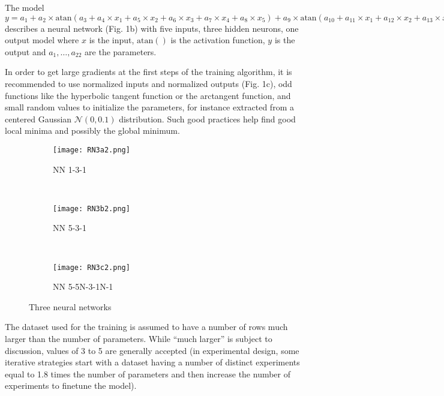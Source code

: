 The model
\(y = a_1 + a_2\times \text{atan}(a_3 + a_4\times x_1 + a_5\times x_2 + a_6\times x_3 + a_7\times x_4 + a_8\times x_5) + a_9\times \text{atan}(a_{10} + a_{11}\times x_1 + a_{12}\times x_2 + a_{13}\times x_3 + a_{14}\times x_4 + a_{15}\times x_5) + a_{16}\text{atan}(a_{17} + a_{18}\times x_1 + a_{19}\times x_2 + a_{20}\times x_3 + a_{21}\times x_4 + a_{22}\times x_5)\)
describes a neural network (Fig. 1b) with five inputs, three hidden
neurons, one output model where \(x\) is the input, \(\text{atan}()\) is
the activation function, \(y\) is the output and \(a_1,\dots,a_{22}\)
are the parameters.

In order to get large gradients at the first steps of the training
algorithm, it is recommended to use normalized inputs and normalized
outputs (Fig. 1c), odd functions like the hyperbolic tangent function or
the arctangent function, and small random values to initialize the
parameters, for instance extracted from a centered Gaussian
\(\mathcal N(0, 0.1)\) distribution. Such good practices help find good
local minima and possibly the global minimum.

\begin{figure}
    \centering
    \begin{subfigure}[b]{0.242\textwidth}
        \texttt{[image: RN3a2.png]}
        \caption{NN 1-3-1}
        \label{fig:N131}
    \end{subfigure}
    ~ 
    \begin{subfigure}[b]{0.250\textwidth}
        \texttt{[image: RN3b2.png]}
        \caption{NN 5-3-1}
        \label{fig:N531}
    \end{subfigure}
    ~ 
    \begin{subfigure}[b]{0.396\textwidth}
        \texttt{[image: RN3c2.png]}
        \caption{NN 5-5N-3-1N-1}
        \label{fig:N55311}
    \end{subfigure}
    \caption{Three neural networks}
\end{figure}

The dataset used for the training is assumed to have a number of rows
much larger than the number of parameters. While ``much larger'' is
subject to discussion, values of 3 to 5 are generally accepted (in
experimental design, some iterative strategies start with a dataset
having a number of distinct experiments equal to 1.8 times the number of
parameters and then increase the number of experiments to finetune the
model).


